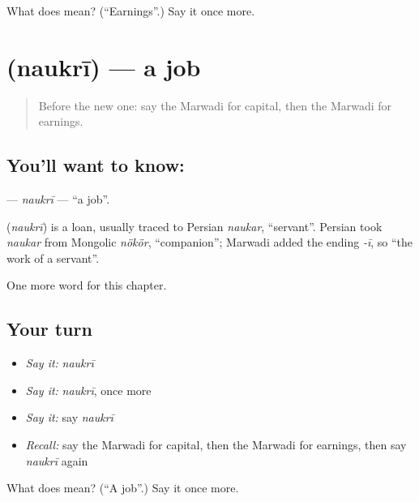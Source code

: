 \begin{tcolorbox}[breakable,colback=teal!4,colframe=teal!35!black,title={Before you move on}]
What does  mean? (\textquotedblleft{}Earnings\textquotedblright{}.) Say it once more.
\end{tcolorbox}
\section[\texorpdfstring{\mw{नौकरी} (naukrī)}{नौकरी (naukrī)}]{ (naukrī) — a job}

\label{lesson:MW-C115-naukri}



\begin{quote}
Before the new one: say the Marwadi for capital, then the Marwadi for earnings.
\end{quote}

\subsection*{You'll want to know: }
\textbf{} — \emph{naukrī} — \textquotedblleft{}a job\textquotedblright{}.

\begin{cousinweb}
\textbf{} (\emph{naukrī}) is a loan, usually traced to Persian \emph{naukar}, \textquotedblleft{}servant\textquotedblright{}. Persian took \emph{naukar} from Mongolic \emph{nökör}, \textquotedblleft{}companion\textquotedblright{}; Marwadi added the ending \emph{-ī}, so \textquotedblleft{}the work of a servant\textquotedblright{}.
\end{cousinweb}

\begin{grammarlens}[title={What you've built}]
One more word for this chapter.
\end{grammarlens}

\subsection*{Your turn}
\begin{itemize}
\raggedright
  \item \emph{Say it:} \emph{naukrī}
  \item \emph{Say it:} \emph{naukrī}, once more
  \item \emph{Say it:} say \emph{naukrī}
  \item \emph{Recall:} say the Marwadi for capital, then the Marwadi for earnings, then say \emph{naukrī} again
\end{itemize}

\begin{tcolorbox}[breakable,colback=teal!4,colframe=teal!35!black,title={Before you move on}]
What does  mean? (\textquotedblleft{}A job\textquotedblright{}.) Say it once more.
\end{tcolorbox}
